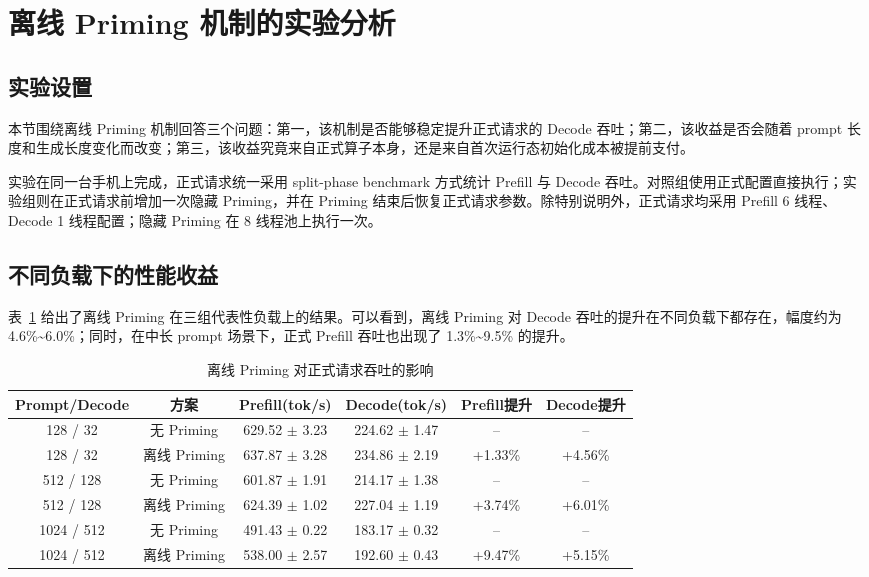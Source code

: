 \section{离线 Priming 机制的实验分析}

\subsection{实验设置}

本节围绕离线 Priming 机制回答三个问题：第一，该机制是否能够稳定提升正式请求的 Decode 吞吐；第二，该收益是否会随着 prompt 长度和生成长度变化而改变；第三，该收益究竟来自正式算子本身，还是来自首次运行态初始化成本被提前支付。

实验在同一台手机上完成，正式请求统一采用 split-phase benchmark 方式统计 Prefill 与 Decode 吞吐。对照组使用正式配置直接执行；实验组则在正式请求前增加一次隐藏 Priming，并在 Priming 结束后恢复正式请求参数。除特别说明外，正式请求均采用 Prefill 6 线程、Decode 1 线程配置；隐藏 Priming 在 8 线程池上执行一次。

\subsection{不同负载下的性能收益}

表~\ref{tab:decode-prime-throughput} 给出了离线 Priming 在三组代表性负载上的结果。可以看到，离线 Priming 对 Decode 吞吐的提升在不同负载下都存在，幅度约为 4.6\%\textasciitilde6.0\%；同时，在中长 prompt 场景下，正式 Prefill 吞吐也出现了 1.3\%\textasciitilde9.5\% 的提升。

\begin{table}[ht]
  \centering
  \caption{离线 Priming 对正式请求吞吐的影响}
  \label{tab:decode-prime-throughput}
  \begin{tabular}{c c c c c c}
    \hline
    Prompt/Decode & 方案 & Prefill(tok/s) & Decode(tok/s) & Prefill提升 & Decode提升 \\
    \hline
    128 / 32 &
    无 Priming &
    629.52 $\pm$ 3.23 &
    224.62 $\pm$ 1.47 &
    -- &
    -- \\
    128 / 32 &
    离线 Priming &
    637.87 $\pm$ 3.28 &
    234.86 $\pm$ 2.19 &
    +1.33\% &
    +4.56\% \\
    \hline
    512 / 128 &
    无 Priming &
    601.87 $\pm$ 1.91 &
    214.17 $\pm$ 1.38 &
    -- &
    -- \\
    512 / 128 &
    离线 Priming &
    624.39 $\pm$ 1.02 &
    227.04 $\pm$ 1.19 &
    +3.74\% &
    +6.01\% \\
    \hline
    1024 / 512 &
    无 Priming &
    491.43 $\pm$ 0.22 &
    183.17 $\pm$ 0.32 &
    -- &
    -- \\
    1024 / 512 &
    离线 Priming &
    538.00 $\pm$ 2.57 &
    192.60 $\pm$ 0.43 &
    +9.47\% &
    +5.15\% \\
    \hline
  \end{tabular}
\end{table}

